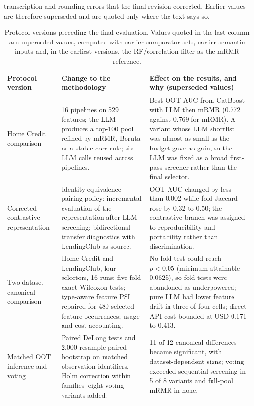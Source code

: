 \documentclass[final,5p,twocolumn]{elsarticle}
\begin{document}
transcription and rounding errors that the final revision corrected. Earlier values are therefore superseded and are quoted only where the text says so.

\begin{table}[htbp]
\centering
\footnotesize
\setlength{\tabcolsep}{5pt}
\begin{threeparttable}
\caption{Protocol versions preceding the final evaluation. Values quoted in the last column are superseded values, computed with earlier comparator sets, earlier semantic inputs and, in the earliest versions, the RF/correlation filter as the mRMR reference.}
\label{tab:stages}
\begin{tabular}{@{}L{27mm}L{\dimexpr(\textwidth-27mm-4\tabcolsep)/2\relax}L{\dimexpr(\textwidth-27mm-4\tabcolsep)/2\relax}@{}}
\toprule
Protocol version & Change to the methodology & Effect on the results, and why (superseded values) \\
\midrule
Home Credit comparison & 16 pipelines on 529 features; the LLM produces a top-100 pool refined by mRMR, Boruta or a stable-core rule; six LLM calls reused across pipelines. & Best OOT AUC from CatBoost with LLM then mRMR (0.772 against 0.769 for mRMR). A variant whose LLM shortlist was almost as small as the budget gave no gain, so the LLM was fixed as a broad first-pass screener rather than the final selector. \\
\addlinespace
Corrected contrastive representation & Identity-equivalence pairing policy; incremental evaluation of the representation after LLM screening; bidirectional transfer diagnostics with LendingClub as source. & OOT AUC changed by less than 0.002 while fold Jaccard rose by 0.32 to 0.50; the contrastive branch was assigned to reproducibility and portability rather than discrimination. \\
\addlinespace
Two-dataset canonical comparison & Home Credit and LendingClub, four selectors, 16 runs; five-fold exact Wilcoxon tests; type-aware feature PSI repaired for 480 selected-feature occurrences; usage and cost accounting. & No fold test could reach $p<0.05$ (minimum attainable 0.0625), so fold tests were abandoned as underpowered; pure LLM had lower feature drift in three of four cells; direct API cost bounded at USD 0.171 to 0.413. \\
\addlinespace
Matched OOT inference and voting & Paired DeLong tests and 2,000-resample paired bootstrap on matched observation identifiers, Holm correction within families; eight voting variants added. & 11 of 12 canonical differences became significant, with dataset-dependent signs; voting exceeded sequential screening in 5 of 8 variants and full-pool mRMR in none. \\

\end{tabular}
\end{threeparttable}
\end{table}
\end{document}
